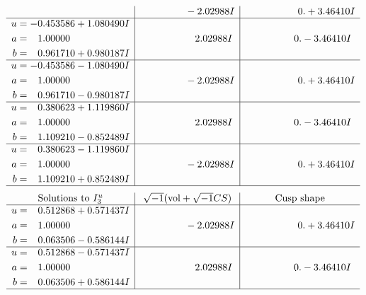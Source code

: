 \documentclass[1p]{elsarticle_modified}
\theoremstyle{definition}
\newcommand{\I}{\sqrt{-1}}
\begin{document}
$$\begin{array}{c|c|c}
 & \phantom{-0.000000 } -2.02988 I & \phantom{-0.000000 -}0. + 3.46410 I \\ \hline\begin{aligned}
u &= -0.453586 + 1.080490 I \\
a &= \phantom{-}1.00000\phantom{ +0.000000I} \\
b &= \phantom{-}0.961710 + 0.980187 I\end{aligned}
 & \phantom{-0.000000 -}2.02988 I & \phantom{-0.000000 } 0. - 3.46410 I \\ \hline\begin{aligned}
u &= -0.453586 - 1.080490 I \\
a &= \phantom{-}1.00000\phantom{ +0.000000I} \\
b &= \phantom{-}0.961710 - 0.980187 I\end{aligned}
 & \phantom{-0.000000 } -2.02988 I & \phantom{-0.000000 -}0. + 3.46410 I \\ \hline\begin{aligned}
u &= \phantom{-}0.380623 + 1.119860 I \\
a &= \phantom{-}1.00000\phantom{ +0.000000I} \\
b &= \phantom{-}1.109210 - 0.852489 I\end{aligned}
 & \phantom{-0.000000 -}2.02988 I & \phantom{-0.000000 } 0. - 3.46410 I \\ \hline\begin{aligned}
u &= \phantom{-}0.380623 - 1.119860 I \\
a &= \phantom{-}1.00000\phantom{ +0.000000I} \\
b &= \phantom{-}1.109210 + 0.852489 I\end{aligned}
 & \phantom{-0.000000 } -2.02988 I & \phantom{-0.000000 -}0. + 3.46410 I\\
 \hline 
 \end{array}$$\newpage$$\begin{array}{c|c|c}  
\text{Solutions to }I^u_{3}& \I (\text{vol} + \sqrt{-1}CS) & \text{Cusp shape}\\
 \hline 
\begin{aligned}
u &= \phantom{-}0.512868 + 0.571437 I \\
a &= \phantom{-}1.00000\phantom{ +0.000000I} \\
b &= \phantom{-}0.063506 - 0.586144 I\end{aligned}
 & \phantom{-0.000000 } -2.02988 I & \phantom{-0.000000 -}0. + 3.46410 I \\ \hline\begin{aligned}
u &= \phantom{-}0.512868 - 0.571437 I \\
a &= \phantom{-}1.00000\phantom{ +0.000000I} \\
b &= \phantom{-}0.063506 + 0.586144 I\end{aligned}
 & \phantom{-0.000000 -}2.02988 I & \phantom{-0.000000 } 0. - 3.46410 I\\
 \hline 
 \end{array}$$\newpage\newpage\renewcommand{\arraystretch}{1}
\end{document}
